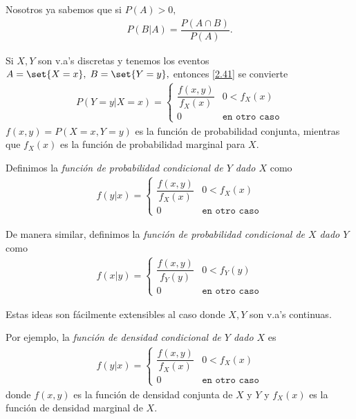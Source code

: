  Nosotros ya sabemos que si $P(A)>0,$
 \begin{align}
  \label{eq:0.2.41}
  P(B|A)=\dfrac{P(A\cap B)}{P(A)}.
 \end{align}



 Si $X,Y$ son v.a's discretas y tenemos los eventos $A=\set{X=x}, \; B=\set{Y=y},$ entonces \eqref{2.41} se convierte
 \begin{align}
  \label{eq:0.2.42}
  P(Y=y|X=x)=
  \begin{cases}
   \dfrac{f(x,y)}{f_{X}(x)} & 0 < f_{X}(x)  \\
   0 & \texttt{en otro caso}
  \end{cases}
 \end{align}
 $f(x,y)=P(X=x,Y=y)$ es la función de probabilidad conjunta, mientras que $f_{X}(x)$ es la función de probabilidad marginal para $X.$


 Definimos la \emph{función de probabilidad condicional de $Y$ dado $X$} como
 \begin{align}
  \label{eq:0.2.43}
  f(y|x)=
  \begin{cases}
   \dfrac{f(x,y)}{f_{X}(x)} & 0 < f_{X}(x)  \\
   0 & \texttt{en otro caso}
  \end{cases}
 \end{align}



 De manera similar, definimos la \emph{función de probabilidad condicional de $X$ dado $Y$} como
 \begin{align}
  \label{eq:0.2.44}
  f(x|y)=
  \begin{cases}
   \dfrac{f(x,y)}{f_{Y}(y)} & 0 < f_{Y}(y)  \\
   0 & \texttt{en otro caso}
  \end{cases}
 \end{align}


 Estas ideas son fácilmente extensibles al caso donde $X,Y$ son v.a's continuas.


 Por ejemplo, la \emph{función de densidad condicional de $Y$ dado $X$} es
 \begin{align}
  \label{eq:0.2.45}
  f(y|x)=
    \begin{cases}
   \dfrac{f(x,y)}{f_{X}(x)} & 0 < f_{X}(x)  \\
   0 & \texttt{en otro caso}
  \end{cases}
 \end{align}
 donde $f(x,y)$ es la función de densidad conjunta de $X$ y $Y$ y $f_{X}(x)$ es la función de densidad marginal de $X.$


